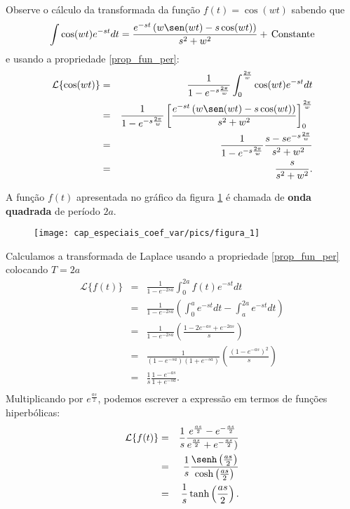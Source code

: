 \begin{ex}Observe o cálculo da transformada da função $f(t)=\cos(wt)$ sabendo que
\begin{equation}
\int \cos(wt)e^{-st}dt=\frac{e^{-st}\left(w\sen(wt)-s\cos(wt)\right)}{s^2+w^2}+\ \!\hbox{Constante}
\end{equation}
e usando a propriedade \ref{prop_fun_per}:
\begin{eqnarray*} 
\mathcal{L}\{\cos(wt)\}&=&\frac{1}{1-e^{-s\frac{2\pi }{w}}}\int_0^{\frac{2\pi }{w}}\cos(wt)e^{-st}dt\\
&=&\frac{1}{1-e^{-s\frac{2\pi }{w}}}\left[\frac{e^{-st}\left(w\sen(wt)-s\cos(wt)\right)}{s^2+w^2}\right]_0^{\frac{2\pi }{w}}\\
&=&\frac{1}{1-e^{-s\frac{2\pi }{w}}}\frac{s-se^{-s\frac{2\pi }{w}}}{s^2+w^2}\\
&=&\frac{s}{s^2+w^2}.
\end{eqnarray*}
\end{ex}
\begin{ex}{\label{ex_onda_quadrada}}A função $f(t)$ apresentada no gráfico da figura \ref{fig_onda_quadrada} é chamada de {\bf onda quadrada} de período $2a$.
 \begin{figure}[!ht]
\begin{center}

\texttt{[image: cap\_especiais\_coef\_var/pics/figura\_1]}\end{center}
\caption{\label{fig_onda_quadrada}}
\end{figure}
Calculamos a transformada de Laplace usando a propriedade \ref{prop_fun_per} colocando $T=2a$
\begin{eqnarray*}
\mathcal{L}\{f(t)\}&=& \frac{1}{1-e^{-2sa}}\int_0^{2a}f(t)e^{-st}dt\\
&=& \frac{1}{1-e^{-2sa}}\left(\int_0^{a}e^{-st}dt-\int_a^{2a}e^{-st}dt\right)\\
&=& \frac{1}{1-e^{-2sa}}\left(\frac{1-2e^{-as}+e^{-2as}}{s}\right)\\
&=& \frac{1}{(1-e^{-sa})(1+e^{-sa})}\left(\frac{(1-e^{-as})^2}{s}\right)\\
&=&\frac{1}{s} \frac{1-e^{-as}}{1+e^{-sa}}.\\
\end{eqnarray*}
Multiplicando por $e^{\frac{as}{2}}$, podemos escrever a expressão em termos de funções hiperbólicas:
\begin{eqnarray*}
\mathcal{L}\{f(t)\}&=&\frac{1}{s} \frac{e^{\frac{as}{2}}-e^{-\frac{as}{2}}}{e^{\frac{as}{2}}+e^{-\frac{as}{2}})}\\
&=&\frac{1}{s} \frac{\senh\left(\frac{as}{2}\right)}{\cosh\left(\frac{as}{2}\right)}\\
&=&\frac{1}{s} \tanh\left(\frac{as}{2}\right).
\end{eqnarray*}
\end{ex}
